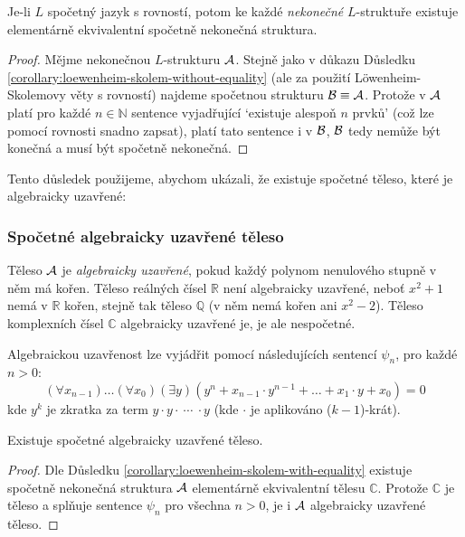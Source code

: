\begin{corollary}\label{corollary:loewenheim-skolem-with-equality}
    Je-li $L$ spočetný jazyk s rovností, potom ke každé \emph{nekonečné} $L$-struktuře existuje elementárně ekvivalentní spočetně nekonečná struktura.
\end{corollary}
\begin{proof}
    Mějme nekonečnou $L$-strukturu $\mathcal{A}$. Stejně jako v důkazu Důsledku \ref{corollary:loewenheim-skolem-without-equality} (ale za použití Löwenheim-Skolemovy věty s rovností) najdeme spočetnou strukturu $\mathcal{B}\equiv\mathcal{A}$. Protože v $\mathcal{A}$ platí pro každé $n\in\mathbb N$ sentence vyjadřující `existuje alespoň $n$ prvků' (což lze pomocí rovnosti snadno zapsat), platí tato sentence i v $\mathcal{B}$, $\mathcal{B}$ tedy nemůže být konečná a musí být spočetně nekonečná.
\end{proof}

Tento důsledek použijeme, abychom ukázali, že existuje spočetné těleso, které je algebraicky uzavřené:

\subsubsection*{Spočetné algebraicky uzavřené těleso}

Těleso $\mathcal{A}$ je \emph{algebraicky uzavřené}, pokud každý polynom nenulového stupně v něm má kořen. Těleso reálných čísel $\mathbb R$ není algebraicky uzavřené, neboť $x^2+1$ nemá v $\mathbb R$ kořen, stejně tak těleso $\mathbb Q$ (v něm nemá kořen ani $x^2-2$). Těleso komplexních čísel $\mathbb C$ algebraicky uzavřené je, je ale nespočetné.

Algebraickou uzavřenost lze vyjádřit pomocí následujících sentencí $\psi_n$, pro každé $n>0$:
$$
(\forall x_{n-1})\dots(\forall x_0)(\exists y)(y^n+x_{n-1}\cdot y^{n-1}+\dots+x_1\cdot y + x_0) = 0
$$
kde $y^k$ je zkratka za term $y\cdot y \cdot\ \cdots\ \cdot y$ (kde  $\cdot$ je aplikováno ($k-1$)-krát).

\begin{corollary}
    Existuje spočetné algebraicky uzavřené těleso.
\end{corollary}
\begin{proof}
    Dle Důsledku \ref{corollary:loewenheim-skolem-with-equality} existuje spočetně nekonečná struktura $\mathcal{A}$ elementárně ekvivalentní tělesu $\mathbb C$. Protože $\mathbb C$ je těleso a splňuje sentence $\psi_n$ pro všechna $n>0$, je i $\mathcal{A}$ algebraicky uzavřené těleso.
\end{proof}


